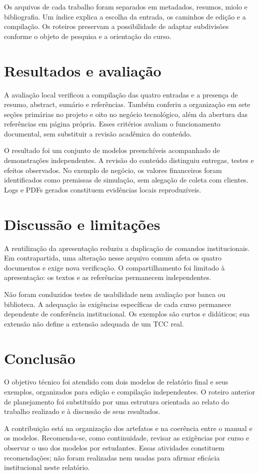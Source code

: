 Os arquivos de cada trabalho foram separados em metadados, resumos, miolo
e bibliografia. Um índice explica a escolha da entrada, os caminhos de
edição e a compilação. Os roteiros preservam a possibilidade de adaptar
subdivisões conforme o objeto de pesquisa e a orientação do curso.

\chapter{Resultados e avaliação}
A avaliação local verificou a compilação das quatro entradas e a presença
de resumo, abstract, sumário e referências. Também conferiu a organização
em sete seções primárias no projeto e oito no negócio tecnológico, além
da abertura das referências em página própria. Esses critérios avaliam
o funcionamento documental, sem substituir a revisão acadêmica do conteúdo.

O resultado foi um conjunto de modelos preenchíveis acompanhado de
demonstrações independentes. A revisão do conteúdo distinguiu entregas,
testes e efeitos observados. No exemplo de negócio, os valores financeiros
foram identificados como premissas de simulação, sem alegação de coleta
com clientes. Logs e PDFs gerados constituem evidências locais reproduzíveis.

\chapter{Discussão e limitações}
A reutilização da apresentação reduziu a duplicação de comandos institucionais.
Em contrapartida, uma alteração nesse arquivo comum afeta os quatro
documentos e exige nova verificação. O compartilhamento foi limitado à
apresentação: os textos e as referências permanecem independentes.

Não foram conduzidos testes de usabilidade nem avaliação por banca ou
biblioteca. A adequação às exigências específicas de cada curso permanece
dependente de conferência institucional. Os exemplos são curtos e didáticos;
sua extensão não define a extensão adequada de um TCC real.

\chapter{Conclusão}
O objetivo técnico foi atendido com dois modelos de relatório final e seus
exemplos, organizados para edição e compilação independentes. O roteiro
anterior de planejamento foi substituído por uma estrutura orientada ao
relato do trabalho realizado e à discussão de seus resultados.

A contribuição está na organização dos artefatos e na coerência entre o
manual e os modelos. Recomenda-se, como continuidade, revisar as exigências
por curso e observar o uso dos modelos por estudantes. Essas atividades
constituem recomendações; não foram realizadas nem usadas para afirmar
eficácia institucional neste relatório.
